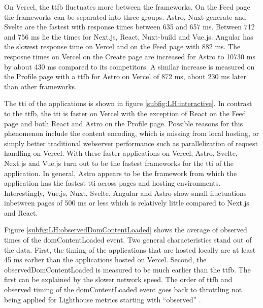 \documentclass[a4paper, 10pt]{article}
\begin{document}
On Vercel, the \acrshort{ttfb} fluctuates more between the frameworks.
On the Feed page the frameworks can be separated into three groups.
Astro, Nuxt-generate and Svelte are the fastest with response times between 635 and 657 ms.
Between 712 and 756 ms lie the times for Next.js, React, Nuxt-build and Vue.js.
Angular has the slowest response time on Vercel and on the Feed page with 882 ms.
The resposne times on Vercel on the Create page are increased for Astro to 10730 ms by about 430 ms compared to its competitors.
A similar increase is measured on the Profile page with a \acrshort{ttfb} for Astro on Vercel of 872 ms, about 230 ms later than other frameworks.

The \acrlong{tti} of the applications is shown in figure \ref{subfig:LH:interactive}. In contrast to the \acrshort{ttfb}, the \acrshort{tti} is faster on Vercel with the exception of React on the Feed page and both React and Astro on the Profile page.
Possible reasons for this phenomenon include the content encoding, which is missing from local hosting, or simply better traditional webserver performance such as parallelization of request handling on Vercel.
With these faster applications on Vercel, Astro, Svelte, Next.js and Vue.js turn out to be the fastest frameworks for the \acrlong{tti} of the application.
In general, Astro appears to be the framework from which the application has the fastest \acrshort{tti} across pages and hosting environments.
Interestingly, Vue.js, Nuxt, Svelte, Angular and Astro show small fluctuations inbetween pages of 500 ms or less which is relatively little compared to Next.js and React.

Figure \ref{subfig:LH:observedDomContentLoaded} shows the average of observed times of the domContentLoaded event.
Two general characteristics stand out of the data.
First, the timing of the applications that are hosted locally are at least 45 ms earlier than the applications hosted on Vercel.
Second, the observedDomContentLoaded is measured to be much earlier than the \acrshort{ttfb}.
The first can be explained by the slower network speed.
The order of \acrshort{ttfb} and observed timing of the domContentLoaded event goes back to throttling not being applied for Lighthouse metrics starting with \enquote{observed} \citep{observedMetrics}.
\end{document}
